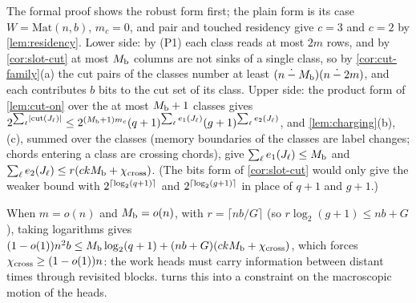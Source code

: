 \begin{outline}
The formal proof shows the robust form first; the plain form is its case $W=\mathrm{Mat}(n,b)$,
$m_c=0$, and pair and touched residency give $c=3$ and $c=2$ by \cref{lem:residency}. Lower side: by
(P1) each class reads at most $2m$ rows, and by \cref{cor:slot-cut} at most $M_{\mathrm{b}}$ columns are not
sinks of a single class, so by \cref{cor:cut-family}(a) the cut pairs of the classes number at least
$(n\mathbin{\dot{-}}M_{\mathrm{b}})(n\mathbin{\dot{-}}2m)$, and each contributes $b$ bits to the cut set of its class. Upper
side: the product form of \cref{lem:cut-on} over the at most $M_{\mathrm{b}}+1$ classes gives
$2^{\sum_\ell\lvert \mathrm{cut}(J_\ell) \rvert}\le2^{(M_{\mathrm{b}}+1)m_c}(q+1)^{\sum_\ell e_1(J_\ell)}(g+1)^{\sum_\ell e_2(J_\ell)}$,
and \cref{lem:charging}(b),(c), summed over the classes (memory boundaries of the classes are label
changes; chords entering a class are crossing chords), give $\sum_\ell e_1(J_\ell)\le M_{\mathrm{b}}$ and
$\sum_\ell e_2(J_\ell)\le r(ckM_{\mathrm{b}}+\chi_{\mathrm{cross}})$. (The bits form of \cref{cor:slot-cut} would only give
the weaker bound with $2^{\lceil \log_2 (q+1) \rceil}$ and $2^{\lceil \log_2 (g+1) \rceil}$ in place of $q+1$ and $g+1$.)
\end{outline}

When $m=o(n)$ and $M_{\mathrm{b}}=o(n)$, with $r=\lceil nb/G\rceil$ (so $r\log_2(g+1)\le nb+G$), taking logarithms
gives $(1-o(1))n^2b\le M_{\mathrm{b}}\log_2(q+1)+(nb+G)(ckM_{\mathrm{b}}+\chi_{\mathrm{cross}})$, which forces $\chi_{\mathrm{cross}}\ge(1-o(1))n$: the work
heads must carry information between distant times through revisited blocks.  turns this into a constraint on the macroscopic motion of the
heads.
